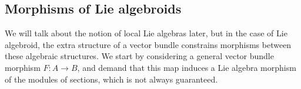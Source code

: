 % 

\subsection{Morphisms of Lie algebroids} %
\label{sub:morphisms_of_la}

We will talk about the notion of local Lie algebras later, but in the case of Lie algebroid, the extra structure of a vector bundle constrains morphisms between these algebraic structures.
We start by considering a general vector bundle morphism $F: A \rightarrow B$, and demand that this map induces a Lie algebra morphism of the modules of sections, which is not always guaranteed.
% 
